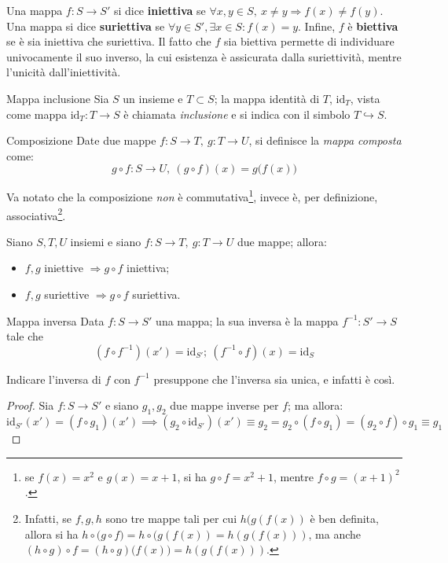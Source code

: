 \documentclass[11pt, a4paper]{scrartcl}
\theoremstyle{definition}
\numberwithin{esempio}{section}
\theoremstyle{definition}
\numberwithin{obs}{section}
\numberwithin{nota}{section}
\numberwithin{equation}{subsection}
\begin{document}
Una mappa $f :S\to S'$ si dice \textbf{iniettiva} se $\forall x,y \in S, \ x \neq y \Rightarrow f(x) \neq f(y)$. Una mappa si dice \textbf{suriettiva} se $\forall y \in S', \exists x \in S : f(x) = y $. Infine, $f$ \`e \textbf{biettiva} se \`e sia iniettiva che suriettiva.
Il fatto che $f$ sia biettiva permette di individuare univocamente il suo inverso, la cui esistenza \`e assicurata dalla suriettivit\`a, mentre l'unicit\`a dall'iniettivit\`a.
\begin{definizione}
	{Mappa inclusione}{}
Sia $S$ un insieme e $T \subset S$; la mappa identit\`a di $T$, $\mathrm{id} _T$, vista come mappa $\mathrm{id} _T : T \to S$ \`e chiamata \textit{inclusione} e si indica con il simbolo $T \hookrightarrow S$.
\end{definizione}
\begin{definizione}
	{Composizione}{}
	Date due mappe $f : S \to T, \ g:T \to  U$, si definisce la \textit{mappa composta} come:
	\[
	g \circ f : S \to U , \ (g\circ f ) (x) =  g\big( f(x) \big)
	\] 
\end{definizione}
\noindent Va notato che la composizione \textit{non} \`e commutativa\footnote{se $f(x) = x^2$ e $g(x) = x+1$, si ha $g\circ f = x^2+1$, mentre $f\circ g = (x +1)^2$.}, invece \`e, per definizione, associativa\footnote{Infatti, se $f,g,h$ sono tre mappe tali per cui $h(g(f(x))$ \`e ben definita, allora si ha $h\circ \big(g \circ f\big) = h\circ (g(f(x))=h(g(f(x)))$, ma anche $(h \circ g) \circ f = (h \circ g)\big(f(x)\big) = h(g(f(x)))$.}. 
\begin{prop}
	{}{}
	Siano $S,T,U$ insiemi e siano $f:S \to T , \ g : T \to U$ due mappe; allora:
	\begin{itemize}
		\item $f,g$ iniettive $\Rightarrow g\circ f$ iniettiva;
		\item $f,g$ suriettive $\Rightarrow g\circ f$ suriettiva.
	\end{itemize}
\end{prop}
\begin{definizione}
	{Mappa inversa}{}
	Data $f: S\to S'$ una mappa; la sua inversa \`e la mappa $f^{-1}  : S' \to S$ tale che
	\[
		(f \circ f^{-1} ) (x') = \mathrm{id} _{S'} ; \ (f^{-1} \circ f) (x) = \mathrm{id} _S
	\] 
\end{definizione}
\noindent Indicare l'inversa di $f$ con $f^{-1} $ presuppone che l'inversa sia unica, e infatti \`e cos\`i.
\begin{proof}
	Sia $f:S \to S'$ e siano $g_1, g_2$ due mappe inverse per $f$; ma allora:
	\[
		\mathrm{id} _{S'}(x') = (f\circ g_1) (x') \implies (g_2 \circ \mathrm{id} _{S'}  )(x') \equiv g_2 = g_2\circ (f\circ g_1) = (g_2 \circ f ) \circ g_1 \equiv g_1
	\] 
\end{proof}
\end{document}
